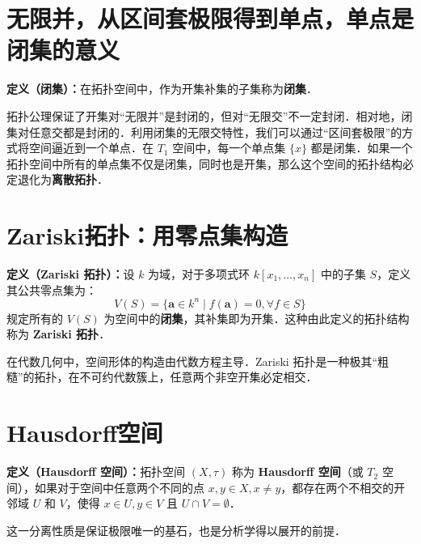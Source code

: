 \section{无限并，从区间套极限得到单点，单点是闭集的意义}
\begin{framed}
\noindent\textbf{定义（闭集）：}在拓扑空间中，作为开集补集的子集称为\textbf{闭集}．
\end{framed}
拓扑公理保证了开集对“无限并”是封闭的，但对“无限交”不一定封闭．相对地，闭集对任意交都是封闭的．利用闭集的无限交特性，我们可以通过“区间套极限”的方式将空间逼近到一个单点．在 $T_1$ 空间中，每一个单点集 $\{x\}$ 都是闭集．如果一个拓扑空间中所有的单点集不仅是闭集，同时也是开集，那么这个空间的拓扑结构必定退化为\textbf{离散拓扑}．

\section{Zariski拓扑：用零点集构造}
\begin{framed}
\noindent\textbf{定义（Zariski 拓扑）：}设 $k$ 为域，对于多项式环 $k[x_1, \dots, x_n]$ 中的子集 $S$，定义其公共零点集为：
$$ V(S) = \{ \mathbf{a} \in k^n \mid f(\mathbf{a}) = 0, \forall f \in S \} $$
规定所有的 $V(S)$ 为空间中的\textbf{闭集}，其补集即为开集．这种由此定义的拓扑结构称为 \textbf{Zariski 拓扑}．
\end{framed}
在代数几何中，空间形体的构造由代数方程主导．Zariski 拓扑是一种极其“粗糙”的拓扑，在不可约代数簇上，任意两个非空开集必定相交．

\section{Hausdorff空间}
\begin{framed}
\noindent\textbf{定义（Hausdorff 空间）：}拓扑空间 $(X, \tau)$ 称为 \textbf{Hausdorff 空间}（或 $T_2$ 空间），如果对于空间中任意两个不同的点 $x, y \in X, x \neq y$，都存在两个不相交的开邻域 $U$ 和 $V$，使得 $x \in U, y \in V$ 且 $U \cap V = \emptyset$．
\end{framed}
这一分离性质是保证极限唯一的基石，也是分析学得以展开的前提．